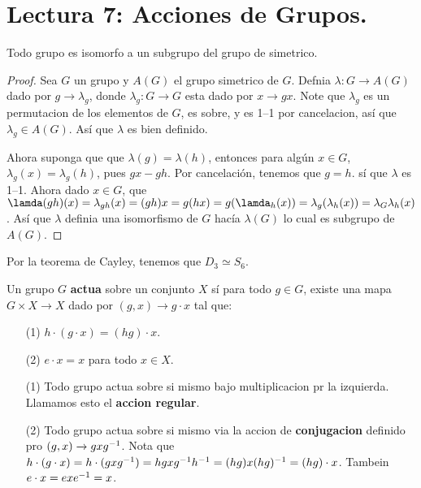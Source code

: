 \section*{Lectura 7: Acciones de Grupos.}

\begin{theorem}\label{thm_7.26}
    Todo grupo es isomorfo a un subgrupo del grupo de simetrico.
\end{theorem}
\begin{proof}
    Sea $G$ un grupo y  $A(G)$ el grupo simetrico de $G$. Defnia $\lambda:G
    \xrightarrow{} A(G)$ dado por $g \xrightarrow{} \lambda_g$, donde
    $\lambda_g:G \xrightarrow{} G$ esta dado por $x \xrightarrow{} gx$. Note que
    $\lambda_g$ es un permutacion de los elementos de  $G$, es sobre, y es 1--1
    por cancelacion, as\'i que  $\lambda_g \in A(G)$. As\'i que $\lambda$ es
    bien definido.

    Ahora suponga que que  $\lambda(g)=\lambda(h)$, entonces para alg\'un $x \in
    G$,  $\lambda_g(x)=\lambda_g(h)$, pues $gx-gh$. Por cancelaci\'on, tenemos
    que  $g=h$. s\'i que  $\lambda$ es 1--1. Ahora dado  $x \in G$, que
    $\lamda(gh)(x)=\lambda_{gh}(x)=(gh)x=g(hx)=g(\lamda_h(x))=\lambda_g(\lambda_h(x))=
    \lambda_G\lambda_h(x)$. As\'i que $\lambda$ definia  una isomorfismo de $G$
    hac\'ia  $\lambda(G)$ lo cual es subgrupo de $A(G)$.
\end{proof}

\begin{example}\label{}
    Por la teorema de Cayley, tenemos que $D_3 \simeq S_6$.
\end{example}

\begin{definition}
    Un grupo $G$  \textbf{actua} sobre un conjunto $X$ s\'i para todo  $g \in
    G$, existe una mapa  $G \times X \xrightarrow{} X$ dado por $(g,x)
    \xrightarrow{} g \cdot x$ tal que:
    \begin{enumerate}
        \item[(1)] $h \cdot (g \cdot x)=(hg) \cdot x$.

        \item[(2)] $e \cdot x=x$ para todo  $x \in X$.
    \end{enumerate}
\end{definition}

\begin{example}\label{}
    \begin{enumerate}
        \item[(1)] Todo grupo actua sobre si mismo bajo multiplicacion pr la
            izquierda. Llamamos esto el \textbf{accion regular}.

        \item[(2)] Todo grupo actua sobre si mismo via la accion de
            \textbf{conjugacion} definido pro $(g,x) \xrightarrow{} gxg^{-1}$.
            Nota que $h \cdot (g \cdot x)=h \cdot
            (gxg^{-1})=hgxg^{-1}h^{-1}=(hg)x(hg)^{-1}=(hg) \cdot x$. Tambein
            $e \cdot x=exe^{-1}=x$.
    \end{enumerate}
\end{example}

